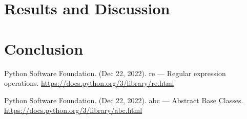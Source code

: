 \documentclass[...]{revdetua}
\begin{document}
\section{Results and Discussion}


\section{Conclusion}


\begin{thebibliography}{9}


% 

Python Software Foundation. (Dec 22, 2022). re — Regular expression operations. \url{https://docs.python.org/3/library/re.html}

Python Software Foundation. (Dec 22, 2022). abc — Abstract Base Classes. \url{https://docs.python.org/3/library/abc.html}

\end{thebibliography}


\end{document}
